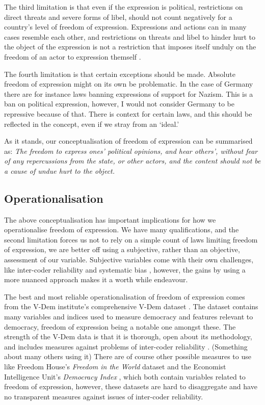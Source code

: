 The third limitation is that even if the expression is political, restrictions on direct threats and severe forms of libel, should not count negatively for a country's level of freedom of expression. Expressions and actions can in many cases resemble each other, and restrictions on threats and libel to hinder hurt to the object of the expression is not a restriction that imposes itself unduly on the freedom of an actor to expression themself \citep[pp. 81-82]{mill_liberty_2010}. 

The fourth limitation is that certain exceptions should be made. Absolute freedom of expression might on its own be problematic. In the case of Germany there are for instance laws banning expressions of support for Nazism. This is a ban on political expression, however, I would not consider Germany to be repressive because of that. There is context for certain laws, and this should be reflected in the concept, even if we stray from an `ideal.'  

As it stands, our conceptualisation of freedom of expression can be summarised as: \textit{The freedom to express ones'  political opinions, and hear others',  without fear of any repercussions from the state, or other actors, and the content should not be a cause of undue hurt to the object.}

\subsection{Operationalisation}
The above conceptualisation has important implications for how we operationalise freedom of expression. We have many qualifications, and the second limitation forces us not to rely on a simple count of laws limiting freedom of expression, we are better off using a subjective, rather than an objective, assessment of our variable. Subjective variables come with their own challenges, like inter-coder reliability and systematic bias \citep[for a discussion see:][]{little_measuring_2024, miller_how_2024}, however, the gains by using a more nuanced approach makes it a worth while endeavour.

The best and most reliable operationalisation of freedom of expression comes from the V-Dem institute's comprehensive V-Dem dataset \citep{coppedge_v-dem_2025}. The dataset contains many variables and indices used to measure democracy and features relevant to democracy, freedom of expression being a notable one amongst these. The strength of the V-Dem data is that it is thorough, open about its methodology, and includes measures against problems of inter-coder reliability \citep{coppedge_v-dem_2024-2}. (Something about many others using it) There are of course other possible measures to use like Freedom House's \textit{Freedom in the World} dataset \citep{freedom_house_freedom_2024} and the Economist Intelligence Unit's \textit{Democracy Index} \citep{economist_intelligence_unit_democracy_2024}, which both contain variables related to freedom of expression, however, these datasets are hard to disaggregate and have no transparent measures against issues of inter-coder reliability.

